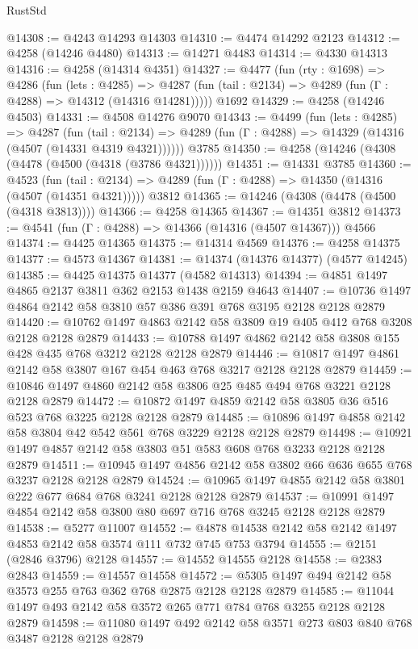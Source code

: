 \begin{lexlean}{RustStd}
\begin{coremodule}
@14308 := @4243 @14293 @14303
@14310 := @4474 @14292 @2123
@14312 := @4258 (@14246 @4480)
@14313 := @14271 @4483
@14314 := @4330 @14313
@14316 := @4258 (@14314 @4351)
@14327 := @4477
    (fun (rty : @1698) =>
    @4286
      (fun (lets : @4285) =>
      @4287 (fun (tail : @2134) => @4289 (fun (Γ : @4288) => @14312 (@14316 @14281)))))
    @1692
@14329 := @4258 (@14246 @4503)
@14331 := @4508 @14276 @9070
@14343 := @4499
    (fun (lets : @4285) =>
    @4287
      (fun (tail : @2134) =>
      @4289 (fun (Γ : @4288) => @14329 (@14316 (@4507 (@14331 @4319 @4321))))))
    @3785
@14350 := @4258 (@14246 (@4308 (@4478 (@4500 (@4318 (@3786 @4321))))))
@14351 := @14331 @3785
@14360 := @4523
    (fun (tail : @2134) => @4289 (fun (Γ : @4288) => @14350 (@14316 (@4507 (@14351 @4321)))))
    @3812
@14365 := @14246 (@4308 (@4478 (@4500 (@4318 @3813))))
@14366 := @4258 @14365
@14367 := @14351 @3812
@14373 := @4541 (fun (Γ : @4288) => @14366 (@14316 (@4507 @14367))) @4566
@14374 := @4425 @14365
@14375 := @14314 @4569
@14376 := @4258 @14375
@14377 := @4573 @14367
@14381 := @14374 (@14376 @14377) (@4577 @14245)
@14385 := @4425 @14375 @14377 (@4582 @14313)
@14394 := @4851 @1497 @4865 @2137 @3811 @362 @2153 @1438 @2159 @4643
@14407 := @10736 @1497 @4864 @2142 @58 @3810 @57 @386 @391 @768 @3195 @2128 @2128 @2879
@14420 := @10762 @1497 @4863 @2142 @58 @3809 @19 @405 @412 @768 @3208 @2128 @2128 @2879
@14433 := @10788 @1497 @4862 @2142 @58 @3808 @155 @428 @435 @768 @3212 @2128 @2128 @2879
@14446 := @10817 @1497 @4861 @2142 @58 @3807 @167 @454 @463 @768 @3217 @2128 @2128 @2879
@14459 := @10846 @1497 @4860 @2142 @58 @3806 @25 @485 @494 @768 @3221 @2128 @2128 @2879
@14472 := @10872 @1497 @4859 @2142 @58 @3805 @36 @516 @523 @768 @3225 @2128 @2128 @2879
@14485 := @10896 @1497 @4858 @2142 @58 @3804 @42 @542 @561 @768 @3229 @2128 @2128 @2879
@14498 := @10921 @1497 @4857 @2142 @58 @3803 @51 @583 @608 @768 @3233 @2128 @2128 @2879
@14511 := @10945 @1497 @4856 @2142 @58 @3802 @66 @636 @655 @768 @3237 @2128 @2128 @2879
@14524 := @10965 @1497 @4855 @2142 @58 @3801 @222 @677 @684 @768 @3241 @2128 @2128 @2879
@14537 := @10991 @1497 @4854 @2142 @58 @3800 @80 @697 @716 @768 @3245 @2128 @2128 @2879
@14538 := @5277 @11007
@14552 := @4878 @14538 @2142 @58 @2142 @1497 @4853 @2142 @58 @3574 @111 @732 @745 @753 @3794
@14555 := @2151 (@2846 @3796) @2128
@14557 := @14552 @14555 @2128
@14558 := @2383 @2843
@14559 := @14557 @14558
@14572 := @5305 @1497 @494 @2142 @58 @3573 @255 @763 @362 @768 @2875 @2128 @2128 @2879
@14585 := @11044 @1497 @493 @2142 @58 @3572 @265 @771 @784 @768 @3255 @2128 @2128 @2879
@14598 := @11080 @1497 @492 @2142 @58 @3571 @273 @803 @840 @768 @3487 @2128 @2128 @2879

\end{coremodule}
\end{lexlean}

